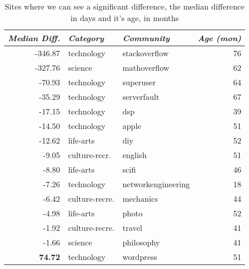 \begin{table}[h]
\centering
\begin{tabular}{@{}rllr@{}}
\toprule
{\small\textit{Median Diff.}} & {\small \textit{Category}} & {\small \textit{Community}} & {\small \textit{Age (mon) }} \\ \midrule
-346.87                            & technology         & stackoverflow      & 76                 \\ \midrule
-327.76                           & science            & mathoverflow       & 62                 \\ \midrule
-70.93                            & technology         & superuser          & 64                 \\ \midrule
-35.29                            & technology         & serverfault        & 67                 \\ \midrule
-17.15                            & technology         & dsp                & 39                 \\ \midrule
-14.50                            & technology         & apple              & 51                 \\ \midrule
-12.62                            & life-arts          & diy                & 52                 \\ \midrule
-9.05                             & culture-recr. & english            & 51                 \\ \midrule
-8.80                             & life-arts          & scifi              & 46                 \\ \midrule
-7.26                             & technology         & networkengineering & 18                 \\ \midrule
-6.42                             & culture-recre. & mechanics          & 44                 \\ \midrule
-4.98                             & life-arts          & photo              & 52                 \\ \midrule
-1.92                             & culture-recre. & travel             & 41                 \\ \midrule
-1.66                             & science            & philosophy         & 41                 \\ \midrule
\textbf{74.72}                             & technology         & wordpress          & 51                 \\ \bottomrule
\end{tabular}
\caption{Sites where we can see a significant difference, the median difference in days and it's age, in months}~\label{table:lifetime}
\end{table}

